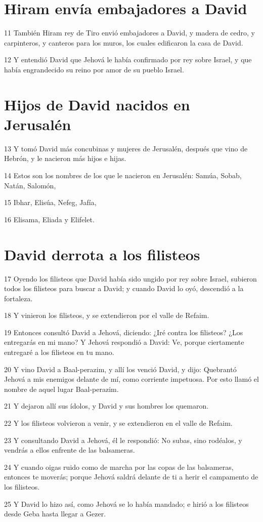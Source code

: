 \section*{Hiram envía embajadores a David}

\par 11 También Hiram rey de Tiro envió embajadores a David, y madera de cedro, y carpinteros, y canteros para los muros, los cuales edificaron la casa de David.
\par 12 Y entendió David que Jehová le había confirmado por rey sobre Israel, y que había engrandecido su reino por amor de su pueblo Israel.

\section*{Hijos de David nacidos en Jerusalén }

\par 13 Y tomó David más concubinas y mujeres de Jerusalén, después que vino de Hebrón, y le nacieron más hijos e hijas.
\par 14 Estos son los nombres de los que le nacieron en Jerusalén: Samúa, Sobab, Natán, Salomón,
\par 15 Ibhar, Elisúa, Nefeg, Jafía,
\par 16 Elisama, Eliada y Elifelet.

\section*{David derrota a los filisteos}

\par 17 Oyendo los filisteos que David había sido ungido por rey sobre Israel, subieron todos los filisteos para buscar a David; y cuando David lo oyó, descendió a la fortaleza.
\par 18 Y vinieron los filisteos, y se extendieron por el valle de Refaim.
\par 19 Entonces consultó David a Jehová, diciendo: ¿Iré contra los filisteos? ¿Los entregarás en mi mano? Y Jehová respondió a David: Ve, porque ciertamente entregaré a los filisteos en tu mano.
\par 20 Y vino David a Baal-perazim, y allí los venció David, y dijo: Quebrantó Jehová a mis enemigos delante de mí, como corriente impetuosa. Por esto llamó el nombre de aquel lugar Baal-perazim.
\par 21 Y dejaron allí sus ídolos, y David y sus hombres los quemaron.
\par 22 Y los filisteos volvieron a venir, y se extendieron en el valle de Refaim.
\par 23 Y consultando David a Jehová, él le respondió: No subas, sino rodéalos, y vendrás a ellos enfrente de las balsameras.
\par 24 Y cuando oigas ruido como de marcha por las copas de las balsameras, entonces te moverás; porque Jehová saldrá delante de ti a herir el campamento de los filisteos.
\par 25 Y David lo hizo así, como Jehová se lo había mandado; e hirió a los filisteos desde Geba hasta llegar a Gezer.

